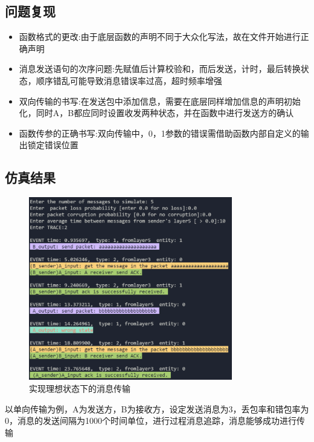 \documentclass[UTF8,14pt]{article}
\numberwithin{figure}{section}
\begin{document}
\subsection{问题复现}
\begin{itemize}
      \setlength{\parskip}{-5mm}
      \item {函数格式的更改:\quad}由于底层函数的声明不同于大众化写法，故在文件开始进行正确声明\\
      \item {消息发送语句的次序问题:\quad}先赋值后计算校验和，而后发送，计时，最后转换状态，顺序错乱可能导致消息错误率过高，超时频率增强\\
      \item {双向传输的书写:\quad}在发送包中添加信息，需要在底层同样增加信息的声明初始化，同时A，B都应同时设置收发两种状态，并在函数中进行发送方的确认\\
      \item {函数传参的正确书写:\quad}双向传输中，0，1参数的错误需借助函数内部自定义的输出锁定错误位置\\
\end{itemize}
\vspace*{-0.8cm}
\newpage
\subsection{仿真结果}
\vspace*{-1cm}
\begin{figure}[!htbp]
      \centering
      \setlength{\abovecaptionskip}{0.cm}
      \includegraphics[width=8.9cm,height=8cm]{result2.png}
      \caption{实现理想状态下的消息传输}
\end{figure}

以单向传输为例，A为发送方，B为接收方，设定发送消息为3，丢包率和错包率为0，消息的发送间隔为1000个时间单位，进行过程消息追踪，消息能够成功进行传输
\vspace*{-0.5cm}
\end{document}
